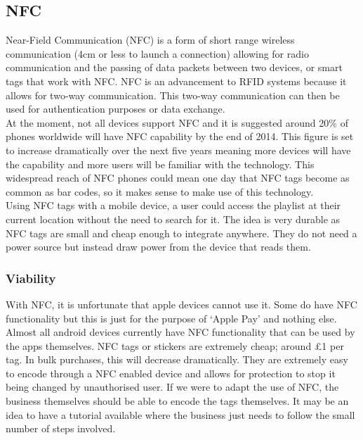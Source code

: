 \subsection{NFC}
Near-Field Communication (NFC) is a form of short range wireless communication (4cm or less to launch a connection) allowing for radio communication and the passing of data packets between two devices, or smart tags that work with NFC. NFC is an advancement to RFID systems because it allows for two-way communication. This two-way communication can then be used for authentication purposes or data exchange. \\
At the moment, not all devices support NFC and it is suggested around 20\% of phones worldwide will have NFC capability by the end of 2014. This figure is set to increase dramatically over the next five years meaning more devices will have the capability and more users will be familiar with the technology. This widespread reach of NFC phones could mean one day that NFC tags become as common as bar codes, so it makes sense to make use of this technology.\\

Using NFC tags with a mobile device, a user could access the playlist at their current location without the need to search for it. The idea is very durable as NFC tags are small and cheap enough to integrate anywhere. They do not need a power source but instead draw power from the device that reads them. \\

\subsubsection{Viability}
With NFC, it is unfortunate that apple devices cannot use it.  Some do have NFC functionality but this is just for the purpose of `Apple Pay' and nothing else.  Almost all android devices currently have NFC functionality that can be used by the apps themselves.  NFC tags or stickers are extremely cheap; around £1 per tag.  In bulk purchases, this will decrease dramatically.  They are extremely easy to encode through a NFC enabled device and allows for protection to stop it being changed by unauthorised user.  If we were to adapt the use of NFC, the business themselves should be able to encode the tags themselves.  It may be an idea to have a tutorial available where the business just needs to follow the small number of steps involved.\\
    